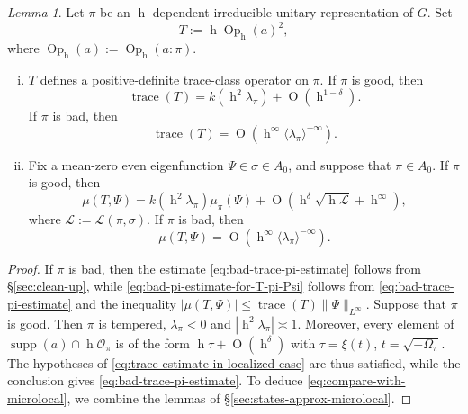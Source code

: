 \documentclass[reqno,10pt]{amsart}
\theoremstyle{plain} %
\theoremstyle{definition}
\theoremstyle{plain} %
\theoremstyle{remark}
\theoremstyle{itplain} %
\newtheorem*{lemma*}{Lemma}
\theoremstyle{remark} %
\renewcommand{\leq}{\leqslant}
\numberwithin{equation}{section}
\DeclareMathOperator{\trace}{trace}
\def\O{\operatorname{O}}
\DeclareMathOperator{\Opp}{Op}
\DeclareMathOperator{\supp}{supp}
\DeclareMathOperator{\h}{h}
\begin{document}
\begin{lemma*}
  Let $\pi$ be an $\h$-dependent irreducible unitary representation of $G$.  Set
  \[
    T := \h \Opp_{\h}(a)^2,
  \]
  where $\Opp_{\h}(a) := \Opp_{\h}(a:\pi)$.
  \begin{enumerate}[(i)]
  \item\label{itm:props-of-T-pi} $T$ defines a positive-definite trace-class operator on $\pi$.  If $\pi$ is good, then
    \begin{equation}\label{eq:trace-estimate-good-case}
      \trace(T)
      =
      k(\h^2  \lambda_\pi)
      + \O(\h^{1-\delta}).
    \end{equation}
    If $\pi$ is bad, then
    \begin{equation}\label{eq:bad-trace-pi-estimate}
      \trace(T)
      =
      \O(\h^\infty \langle \lambda_\pi  \rangle^{-\infty}).
    \end{equation}
  \item\label{itm:estimate-mu-T-pi} Fix a mean-zero even eigenfunction $\Psi \in \sigma \in A_0$, and suppose that $\pi \in A_0$.  If $\pi$ is good, then
    \begin{equation}\label{eq:compare-with-microlocal}
      \mu(T,\Psi)
      =
      k(\h^2 \lambda_\pi)
      \mu_\pi(\Psi)
      + \O(\h^{\delta}
      \sqrt{\h \mathcal{L}}
      + \h^\infty),
    \end{equation}
    where $\mathcal{L} := \mathcal{L}(\pi,\sigma)$.  If $\pi$ is bad, then
    \begin{equation}\label{eq:bad-pi-estimate-for-T-pi-Psi}
      \mu(T,\Psi)
      =
      \O(\h^\infty \langle \lambda_\pi  \rangle^{-\infty}).
    \end{equation}
  \end{enumerate}
\end{lemma*}
\begin{proof}
  If $\pi$ is bad, then the estimate \eqref{eq:bad-trace-pi-estimate} follows from \S\ref{sec:clean-up}, while \eqref{eq:bad-pi-estimate-for-T-pi-Psi} follows from \eqref{eq:bad-trace-pi-estimate} and the inequality $|\mu(T,\Psi)| \leq \trace(T) \|\Psi\|_{L^\infty}$.  Suppose that $\pi$ is good.  Then $\pi$ is tempered, $\lambda_\pi < 0$ and $|\h^2 \lambda_\pi| \asymp 1$.  Moreover, every element of $\supp(a) \cap \h \mathcal{O}_\pi$ is of the form $\h \tau + \O(\h^\delta)$ with $\tau = \xi(t)$, $t = \sqrt{- \Omega_\pi}$.  The hypotheses of \eqref{eq:trace-estimate-in-localized-case} are thus satisfied, while the conclusion gives \eqref{eq:bad-trace-pi-estimate}.  To deduce \eqref{eq:compare-with-microlocal}, we combine the lemmas of \S\ref{sec:states-approx-microlocal}.
\end{proof}
\end{document}
